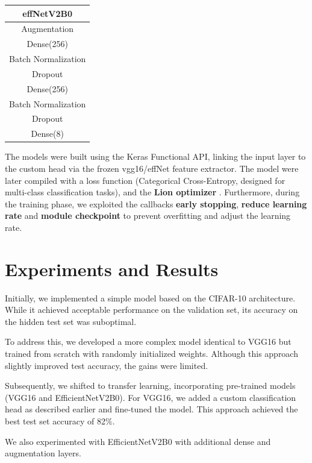 \documentclass[11pt]{article}
\begin{document}
\begin{multicols*}{2}
        \begin{center}
        \begin{tabular}{c}
        \toprule
        effNetV2B0\\
        \hline
        Augmentation\\
        Dense(256)\\
        Batch Normalization\\
        Dropout\\
        Dense(256)\\
        Batch Normalization\\
        Dropout\\
        Dense(8)\\
        \bottomrule
        \end{tabular}
        \end{center}
        
        The models were built using the Keras Functional API, linking the input layer to the custom head via the frozen vgg16/effNet feature extractor. The model were later compiled with a loss function (Categorical Cross-Entropy, designed for multi-class classification tasks), and the \textbf{Lion optimizer} \cite{lion}. Furthermore, during the training phase, we exploited the callbacks \textbf{early stopping}, \textbf{reduce learning rate} and \textbf{module checkpoint} to prevent overfitting and adjust the learning rate.

        \section{Experiments and Results}
        
        Initially, we implemented a simple model based on the CIFAR-10 architecture. While it achieved acceptable performance on the validation set, its accuracy on the hidden test set was suboptimal.
        
        To address this, we developed a more complex model identical to VGG16 but trained from scratch with randomly initialized weights. Although this approach slightly improved test accuracy, the gains were limited.
        
        Subsequently, we shifted to transfer learning, incorporating pre-trained models (VGG16 and EfficientNetV2B0). For VGG16, we added a custom classification head as described earlier and fine-tuned the model. This approach achieved the best test set accuracy of 82\%.
        
        We also experimented with EfficientNetV2B0 with additional dense and augmentation layers.
        

\end{multicols*}
\end{document}
